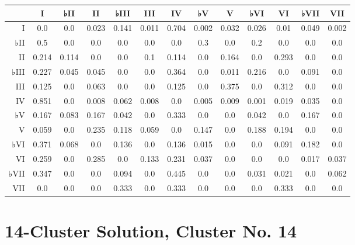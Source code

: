 \begin{table}[htbp]
\begin{minipage}{\linewidth}
\setlength{\tymax}{0.5\linewidth}
\centering
\small
\begin{tabulary}{\textwidth}{@{}RCCCCCCCCCCCC@{}} \toprule
&I&♭II&II&♭III&III&IV&♭V&V&♭VI&VI&♭VII&VII\\
\midrule
I&0.0&0.0&0.023&0.141&0.011&0.704&0.002&0.032&0.026&0.01&0.049&0.002\\
♭II&0.5&0.0&0.0&0.0&0.0&0.0&0.3&0.0&0.2&0.0&0.0&0.0\\
II&0.214&0.114&0.0&0.0&0.1&0.114&0.0&0.164&0.0&0.293&0.0&0.0\\
♭III&0.227&0.045&0.045&0.0&0.0&0.364&0.0&0.011&0.216&0.0&0.091&0.0\\
III&0.125&0.0&0.063&0.0&0.0&0.125&0.0&0.375&0.0&0.312&0.0&0.0\\
IV&0.851&0.0&0.008&0.062&0.008&0.0&0.005&0.009&0.001&0.019&0.035&0.0\\
♭V&0.167&0.083&0.167&0.042&0.0&0.333&0.0&0.0&0.042&0.0&0.167&0.0\\
V&0.059&0.0&0.235&0.118&0.059&0.0&0.147&0.0&0.188&0.194&0.0&0.0\\
♭VI&0.371&0.068&0.0&0.136&0.0&0.136&0.015&0.0&0.0&0.091&0.182&0.0\\
VI&0.259&0.0&0.285&0.0&0.133&0.231&0.037&0.0&0.0&0.0&0.017&0.037\\
♭VII&0.347&0.0&0.0&0.094&0.0&0.445&0.0&0.0&0.031&0.021&0.0&0.062\\
VII&0.0&0.0&0.0&0.333&0.0&0.333&0.0&0.0&0.0&0.333&0.0&0.0\\

\bottomrule

\end{tabulary}
\end{minipage}
\end{table}

\section{14-Cluster Solution, Cluster No. 14}
\label{14-clustersolutionclusterno.14}

